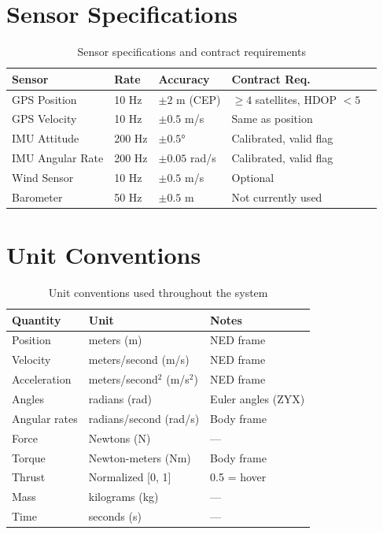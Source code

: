 \section{Sensor Specifications}

\begin{table}[htbp]
    \centering
    \caption{Sensor specifications and contract requirements}
    \label{tab:sensor_specs}
    \begin{tabular}{@{}lllll@{}}
        \toprule
        \textbf{Sensor} & \textbf{Rate} & \textbf{Accuracy} & \textbf{Contract Req.} \\
        \midrule
        GPS Position & 10 Hz & $\pm 2$ m (CEP) & $\geq 4$ satellites, HDOP $< 5$ \\
        GPS Velocity & 10 Hz & $\pm 0.5$ m/s & Same as position \\
        IMU Attitude & 200 Hz & $\pm 0.5°$ & Calibrated, valid flag \\
        IMU Angular Rate & 200 Hz & $\pm 0.05$ rad/s & Calibrated, valid flag \\
        Wind Sensor & 10 Hz & $\pm 0.5$ m/s & Optional \\
        Barometer & 50 Hz & $\pm 0.5$ m & Not currently used \\
        \bottomrule
    \end{tabular}
\end{table}

\section{Unit Conventions}

\begin{table}[htbp]
    \centering
    \caption{Unit conventions used throughout the system}
    \label{tab:units}
    \begin{tabular}{@{}lll@{}}
        \toprule
        \textbf{Quantity} & \textbf{Unit} & \textbf{Notes} \\
        \midrule
        Position & meters (m) & NED frame \\
        Velocity & meters/second (m/s) & NED frame \\
        Acceleration & meters/second$^2$ (m/s$^2$) & NED frame \\
        Angles & radians (rad) & Euler angles (ZYX) \\
        Angular rates & radians/second (rad/s) & Body frame \\
        Force & Newtons (N) & --- \\
        Torque & Newton-meters (Nm) & Body frame \\
        Thrust & Normalized [0, 1] & 0.5 = hover \\
        Mass & kilograms (kg) & --- \\
        Time & seconds (s) & --- \\
        \bottomrule
    \end{tabular}
\end{table}


